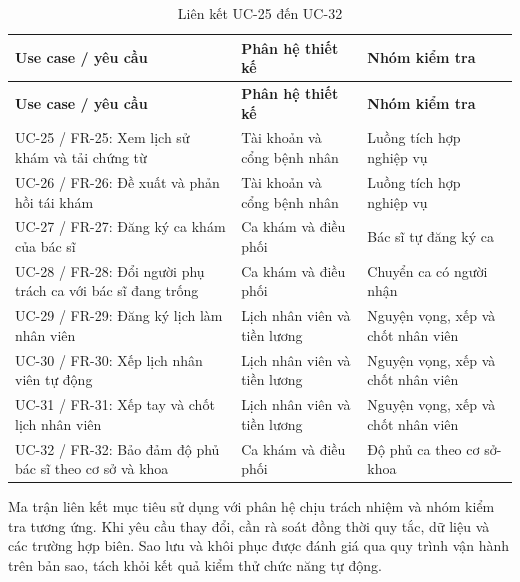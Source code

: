 {\small\setlength{\tabcolsep}{3pt}\renewcommand{\arraystretch}{1.12}
\begin{longtable}{@{}L{\textwidth-4.8pt\relax} L{\textwidth-3.24pt\relax} L{\textwidth-3.96pt\relax}@{}}
\caption{Liên kết UC-25 đến UC-32}\\
\toprule
\textbf{Use case /\allowbreak{} yêu cầu} & \textbf{Phân hệ thiết kế} & \textbf{Nhóm kiểm tra}\\\midrule
\endfirsthead
\toprule
\textbf{Use case /\allowbreak{} yêu cầu} & \textbf{Phân hệ thiết kế} & \textbf{Nhóm kiểm tra}\\\midrule
\endhead
\bottomrule\endlastfoot
UC-25 /\allowbreak{} FR-25:\allowbreak{} Xem lịch sử khám và tải chứng từ & Tài khoản và cổng bệnh nhân & Luồng tích hợp nghiệp vụ\\[3pt]
UC-26 /\allowbreak{} FR-26:\allowbreak{} Đề xuất và phản hồi tái khám & Tài khoản và cổng bệnh nhân & Luồng tích hợp nghiệp vụ\\[3pt]
UC-27 /\allowbreak{} FR-27:\allowbreak{} Đăng ký ca khám của bác sĩ & Ca khám và điều phối & Bác sĩ tự đăng ký ca\\[3pt]
UC-28 /\allowbreak{} FR-28:\allowbreak{} Đổi người phụ trách ca với bác sĩ đang trống & Ca khám và điều phối & Chuyển ca có người nhận\\[3pt]
UC-29 /\allowbreak{} FR-29:\allowbreak{} Đăng ký lịch làm nhân viên & Lịch nhân viên và tiền lương & Nguyện vọng, xếp và chốt nhân viên\\[3pt]
UC-30 /\allowbreak{} FR-30:\allowbreak{} Xếp lịch nhân viên tự động & Lịch nhân viên và tiền lương & Nguyện vọng, xếp và chốt nhân viên\\[3pt]
UC-31 /\allowbreak{} FR-31:\allowbreak{} Xếp tay và chốt lịch nhân viên & Lịch nhân viên và tiền lương & Nguyện vọng, xếp và chốt nhân viên\\[3pt]
UC-32 /\allowbreak{} FR-32:\allowbreak{} Bảo đảm độ phủ bác sĩ theo cơ sở và khoa & Ca khám và điều phối & Độ phủ ca theo cơ sở-khoa\\[3pt]
\end{longtable}}
Ma trận liên kết mục tiêu sử dụng với phân hệ chịu trách nhiệm và nhóm kiểm tra tương ứng.\allowbreak{} Khi yêu cầu thay đổi, cần rà soát đồng thời quy tắc, dữ liệu và các trường hợp biên.\allowbreak{} Sao lưu và khôi phục được đánh giá qua quy trình vận hành trên bản sao, tách khỏi kết quả kiểm thử chức năng tự động.\allowbreak{}

\clearpage

